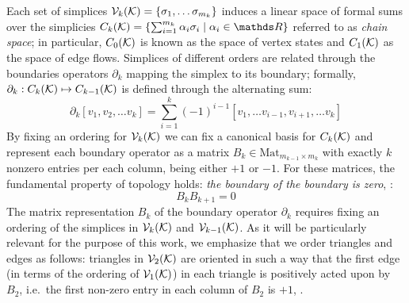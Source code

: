\documentclass{mynotes}
\begin{document}
Each set of simplices \( \mathcal{V}_{k}(\mathcal{K}) = \left\{ \sigma_1, \dots \sigma_{ m_k } \right\} \) induces a linear space of formal sums over the simplicies \( C_k (\mc K) = \left\{  \sum_{i=1}^{ m_k } \alpha_i \sigma_i  \mid \alpha_i \in \ds R \right\} \) referred to as \textit{chain space}; in particular,  \( C_0 ( \mathcal{K} ) \) is known as the space of vertex states and \( C_1 ( \mathcal{K} ) \) as the space of edge flows. Simplices of different orders are related through the boundaries operators \( \partial_k \) mapping the simplex to its boundary; formally, \( \partial_k : C_k ( \mathcal{K} ) \mapsto C_{k-1} ( \mathcal{K} ) \) is defined through the alternating sum:
\begin{equation*}
      \partial_k [ v_1, v_2, \ldots v_k ] = \sum_{i=1}^k (-1)^{i-1} [ v_1, \ldots v_{i-1}, v_{i+1}, \ldots v_k ] 
\end{equation*} 
By fixing an ordering for \( \mathcal{V}_{k}(\mathcal{K}) \) we can fix a canonical basis for \( C_k(\mathcal{K})\) and represent each boundary operator as a matrix  \( B_k \in \mathrm{Mat}_{ m_{k-1} \times m_k } \) with exactly $k$ nonzero entries per each column, being either $+1$ or $-1$. For these matrices, the fundamental property of topology holds: \textit{the boundary of the boundary is zero}, {\cite[Thm.~5.7]{Lim15}}:
\begin{equation}
      \label{eq:bkbk1}
      B_k B_{k+1} = 0 
\end{equation}
The matrix representation $B_k$ of the boundary operator \( \partial_k \) requires fixing an ordering of the simplices in $\mathcal{V}_{k}(\mathcal{K})$ and $\mathcal{V}_{k-1}(\mathcal{K})$. As it will be particularly relevant for the purpose of this work, we emphasize that we order triangles and edges as follows: triangles in \( \mathcal{V}_{2}(\mathcal{K}) \) are oriented in such a way that the first edge (in terms of the ordering of \( \mathcal{V}_{1}(\mathcal{K}) \)) in each triangle is positively acted upon by $B_2$, i.e.\ the first non-zero entry in each column of \(B_2 \) is \( +1 \), . 
\end{document}
